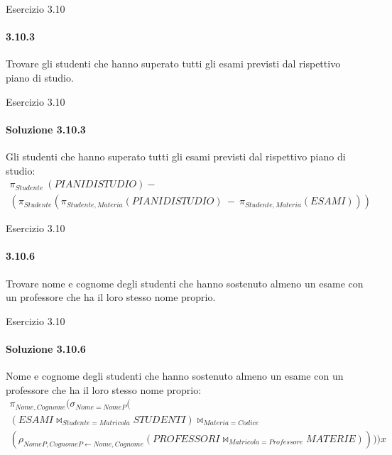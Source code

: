 %
\begin{frame}{Esercizio 3.10}
    \framesubtitle{3.10.3}
    Trovare gli studenti che hanno superato tutti gli esami previsti dal rispettivo piano di studio.
\end{frame}
%
\begin{frame}{Esercizio 3.10}
    \framesubtitle{Soluzione 3.10.3}
    \vspace*{-1.2cm}
    {\small Gli studenti che hanno superato tutti gli esami previsti dal rispettivo piano di studio:}
    \small
    \begin{gather*}
        \pi_{Studente}~(PIANIDISTUDIO)-\\
        (\pi_{Studente}(\pi_{Studente,Materia}(PIANIDISTUDIO)~-~\pi_{Studente,Materia}(ESAMI)))
    \end{gather*}
\end{frame}
%
\begin{frame}{Esercizio 3.10}
    \framesubtitle{3.10.6}
    Trovare nome e cognome degli studenti che hanno sostenuto almeno un esame con un professore che ha il
    loro stesso nome proprio.
\end{frame}
%
\begin{frame}{Esercizio 3.10}
    \framesubtitle{Soluzione 3.10.6}
    \vspace*{-1.2cm}
    {\small Nome e cognome degli studenti che hanno sostenuto almeno un esame con un professore che ha il
    loro stesso nome proprio:}
    \small
    \begin{gather*}
        \pi_{Nome,Cognome}(\sigma_{Nome=NomeP}(\\
        (ESAMI \bowtie_{Studente=Matricola} STUDENTI) \bowtie_{Materia=Codice}\\
        (\rho_{NomeP,CognomeP \leftarrow Nome,Cognome} (PROFESSORI \bowtie_{Matricola=Professore} MATERIE))))x        
    \end{gather*}
\end{frame}